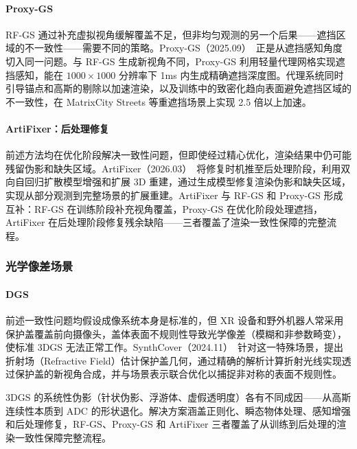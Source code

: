 \paragraph{Proxy-GS}
RF-GS 通过补充虚拟视角缓解覆盖不足，但非均匀观测的另一个后果——遮挡区域的不一致性——需要不同的策略。Proxy-GS（2025.09）~\cite{2509_24421}正是从遮挡感知角度切入同一问题。与 RF-GS 生成新视角不同，Proxy-GS 利用轻量代理网格实现遮挡感知，能在 $1000 \times 1000$ 分辨率下 1ms 内生成精确遮挡深度图。代理系统同时引导锚点和高斯的剔除以加速渲染，以及训练中的致密化趋向表面避免遮挡区域的不一致性，在 MatrixCity Streets 等重遮挡场景上实现 2.5 倍以上加速。

\paragraph{ArtiFixer：后处理修复}
前述方法均在优化阶段解决一致性问题，但即使经过精心优化，渲染结果中仍可能残留伪影和缺失区域。ArtiFixer（2026.03）~\cite{2603_00492}将修复时机推至后处理阶段，利用双向自回归扩散模型增强和扩展 3D 重建，通过生成模型修复渲染伪影和缺失区域，实现从部分观测到完整场景的扩展重建。ArtiFixer 与 RF-GS 和 Proxy-GS 形成互补：RF-GS 在训练阶段补充视角覆盖，Proxy-GS 在优化阶段处理遮挡，ArtiFixer 在后处理阶段修复残余缺陷——三者覆盖了渲染一致性保障的完整流程。

\subsubsection{光学像差场景}

\paragraph{DGS}
前述一致性问题均假设成像系统本身是标准的，但 XR 设备和野外机器人常采用保护盖覆盖前向摄像头，盖体表面不规则性导致光学像差（模糊和非参数畸变），使标准 3DGS 无法正常工作。SynthCover（2024.11）~\cite{2411_06365}针对这一特殊场景，提出折射场（Refractive Field）估计保护盖几何，通过精确的解析计算折射光线实现透过保护盖的新视角合成，并与场景表示联合优化以捕捉非对称的表面不规则性。

\begin{takeaway}
3DGS 的系统性伪影（针状伪影、浮游体、虚假透明度）各有不同成因——从高斯连续性本质到 ADC 的形状退化。解决方案涵盖正则化、瞬态物体处理、感知增强和后处理修复，RF-GS、Proxy-GS 和 ArtiFixer 三者覆盖了从训练到后处理的渲染一致性保障完整流程。
\end{takeaway}

